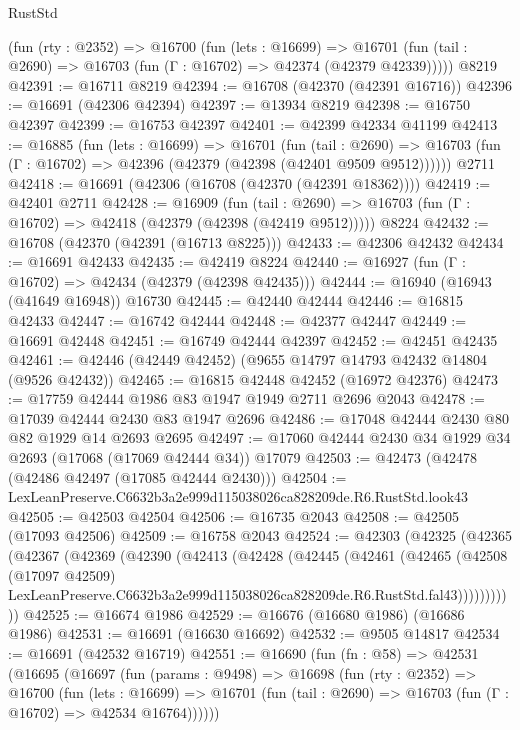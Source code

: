 \begin{lexlean}{RustStd}
\begin{coremodule}
    (fun (rty : @2352) =>
    @16700
      (fun (lets : @16699) =>
      @16701 (fun (tail : @2690) => @16703 (fun (Γ : @16702) => @42374 (@42379 @42339)))))
    @8219
@42391 := @16711 @8219
@42394 := @16708 (@42370 (@42391 @16716))
@42396 := @16691 (@42306 @42394)
@42397 := @13934 @8219
@42398 := @16750 @42397
@42399 := @16753 @42397
@42401 := @42399 @42334 @41199
@42413 := @16885
    (fun (lets : @16699) =>
    @16701
      (fun (tail : @2690) =>
      @16703 (fun (Γ : @16702) => @42396 (@42379 (@42398 (@42401 @9509 @9512))))))
    @2711
@42418 := @16691 (@42306 (@16708 (@42370 (@42391 @18362))))
@42419 := @42401 @2711
@42428 := @16909
    (fun (tail : @2690) => @16703 (fun (Γ : @16702) => @42418 (@42379 (@42398 (@42419 @9512)))))
    @8224
@42432 := @16708 (@42370 (@42391 (@16713 @8225)))
@42433 := @42306 @42432
@42434 := @16691 @42433
@42435 := @42419 @8224
@42440 := @16927 (fun (Γ : @16702) => @42434 (@42379 (@42398 @42435)))
@42444 := @16940 (@16943 (@41649 @16948)) @16730
@42445 := @42440 @42444
@42446 := @16815 @42433
@42447 := @16742 @42444
@42448 := @42377 @42447
@42449 := @16691 @42448
@42451 := @16749 @42444 @42397
@42452 := @42451 @42435
@42461 := @42446 (@42449 @42452) (@9655 @14797 @14793 @42432 @14804 (@9526 @42432))
@42465 := @16815 @42448 @42452 (@16972 @42376)
@42473 := @17759 @42444 @1986 @83 @1947 @1949 @2711 @2696 @2043
@42478 := @17039 @42444 @2430 @83 @1947 @2696
@42486 := @17048 @42444 @2430 @80 @82 @1929 @14 @2693 @2695
@42497 := @17060 @42444 @2430 @34 @1929 @34 @2693 (@17068 (@17069 @42444 @34)) @17079
@42503 := @42473 (@42478 (@42486 @42497 (@17085 @42444 @2430)))
@42504 := LexLeanPreserve.C6632b3a2e999d115038026ca828209de.R6.RustStd.look43
@42505 := @42503 @42504
@42506 := @16735 @2043
@42508 := @42505 (@17093 @42506)
@42509 := @16758 @2043
@42524 := @42303
    (@42325
      (@42365
        (@42367
          (@42369
            (@42390
              (@42413
                (@42428
                  (@42445
                    (@42461
                      (@42465
                        (@42508
                          (@17097 @42509)
                          LexLeanPreserve.C6632b3a2e999d115038026ca828209de.R6.RustStd.fal43)))))))))))
@42525 := @16674 @1986
@42529 := @16676 (@16680 @1986) (@16686 @1986)
@42531 := @16691 (@16630 @16692)
@42532 := @9505 @14817
@42534 := @16691 (@42532 @16719)
@42551 := @16690
    (fun (fn : @58) =>
    @42531
      (@16695
        (@16697
          (fun (params : @9498) =>
          @16698
            (fun (rty : @2352) =>
            @16700
              (fun (lets : @16699) =>
              @16701 (fun (tail : @2690) => @16703 (fun (Γ : @16702) => @42534 @16764))))))

\end{coremodule}
\end{lexlean}
